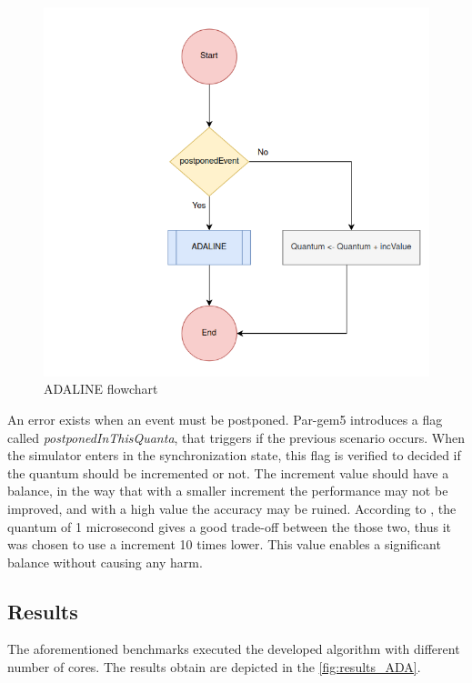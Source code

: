 \begin{figure}[h!]
	\centering
 	\includegraphics[width=0.5\linewidth]{Images/ADALINE_v1.png}
 	\caption{ADALINE flowchart}
	 \label{fig_ADALINE_v1}
\end{figure}

An error exists when an event must be postponed. Par-gem5 \cite{pargem5} introduces a flag called \textit{postponedInThisQuanta}, that triggers if the previous scenario occurs. When the simulator enters in the synchronization state, this flag is verified to decided if the quantum should be incremented or not. The increment value should have a balance, in the way that with a smaller increment the performance may not be improved, and with a high value the accuracy may be ruined. According to \cite{pargem5}, the quantum of 1 microsecond gives a good trade-off between the those two, thus it was chosen to use a increment 10 times lower. This value enables a significant balance without causing any harm.

\subsection{Results}

The aforementioned benchmarks executed the developed algorithm with different number of cores. The results obtain are depicted in the \autoref{fig:results_ADA}. 

